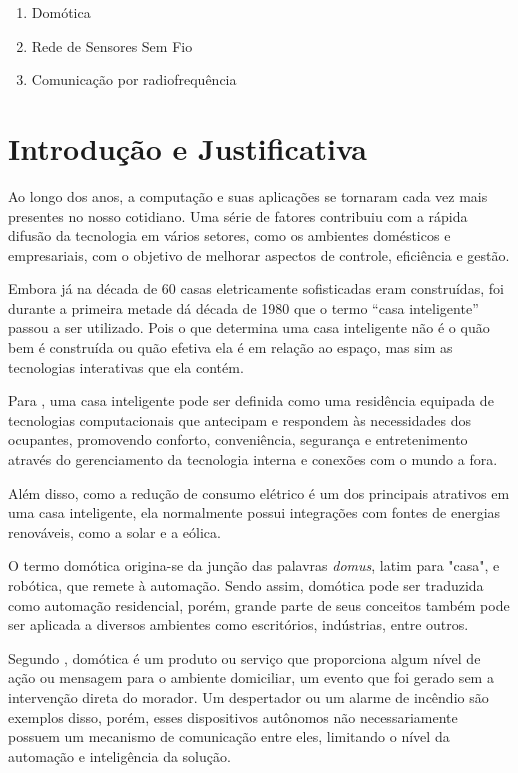 \documentclass[
    12pt,               %
    a4paper,            %
    english,            %
    brazil,             %
    ]{article}
\begin{document}
        \begin{enumerate}
            \item Domótica
			\item Rede de Sensores Sem Fio
			\item Comunicação por radiofrequência
        \end{enumerate}


\section{Introdução e Justificativa}
Ao longo dos anos, a computação e suas aplicações se tornaram cada vez mais presentes no nosso cotidiano. Uma série de fatores
contribuiu com a rápida difusão da tecnologia em vários setores, como os ambientes domésticos e empresariais, com o objetivo de
melhorar aspectos de controle, eficiência e gestão.

Embora já na década de 60 casas eletricamente sofisticadas eram construídas, foi durante a primeira metade dá década de 1980 que o
termo  ``casa inteligente'' passou a ser utilizado. Pois o que determina uma casa inteligente não é o quão bem é construída ou
quão efetiva ela é em relação ao espaço, mas sim as tecnologias interativas que ela contém. \cite{harper2003}

Para , uma casa inteligente pode ser definida como uma residência equipada de tecnologias computacionais
que antecipam e respondem às necessidades dos ocupantes, promovendo conforto, conveniência, segurança e entretenimento através do
gerenciamento da tecnologia interna e conexões com o mundo a fora.

Além disso, como a redução de consumo elétrico é um dos principais atrativos em uma casa inteligente, ela normalmente possui
integrações com fontes de energias renováveis, como a solar e a eólica.

O termo domótica origina-se da junção das palavras \textit{domus}, latim para "casa", e robótica, que remete à automação. Sendo
assim, domótica pode ser traduzida como automação residencial, porém, grande parte de seus conceitos também pode ser aplicada a
diversos ambientes como escritórios, indústrias, entre outros.

Segundo , domótica é um produto ou serviço que proporciona algum nível de ação ou mensagem para o ambiente
domiciliar, um evento que foi gerado sem a intervenção direta do morador. Um despertador ou um alarme de incêndio são exemplos
disso, porém, esses dispositivos autônomos não necessariamente possuem um mecanismo de comunicação entre eles, limitando o nível
da automação e inteligência da solução.
\end{document}
